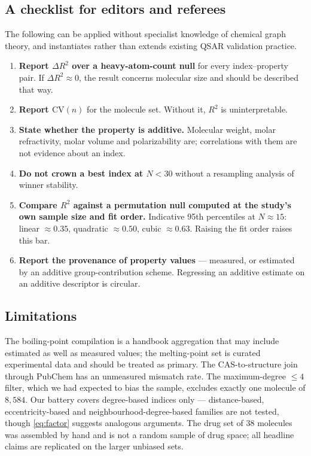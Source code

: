 \documentclass[11pt,a4paper]{article}
\theoremstyle{plain}
\newcommand{\CV}{\mathrm{CV}}
\begin{document}
\subsection{A checklist for editors and referees}

The following can be applied without specialist knowledge of chemical graph theory, and
instantiates rather than extends existing QSAR validation practice.
\begin{enumerate}\itemsep2pt
\item \textbf{Report $\Delta R^2$ over a heavy-atom-count null} for every index--property
pair. If $\Delta R^2\approx0$, the result concerns molecular size and should be described
that way.
\item \textbf{Report $\CV(n)$} for the molecule set. Without it, $R^2$ is uninterpretable.
\item \textbf{State whether the property is additive.} Molecular weight, molar
refractivity, molar volume and polarizability are; correlations with them are not evidence
about an index.
\item \textbf{Do not crown a best index at $N<30$} without a resampling analysis of winner
stability.
\item \textbf{Compare $R^2$ against a permutation null computed at the study's own sample
size and fit order.} Indicative 95th percentiles at $N\approx15$: linear $\approx0.35$,
quadratic $\approx0.50$, cubic $\approx0.63$. Raising the fit order raises this bar.
\item \textbf{Report the provenance of property values} --- measured, or estimated by an
additive group-contribution scheme. Regressing an additive estimate on an additive
descriptor is circular.
\end{enumerate}

\subsection{Limitations}

The boiling-point compilation is a handbook aggregation that may include estimated as well
as measured values; the melting-point set is curated experimental data and should be
treated as primary. The CAS-to-structure join through PubChem has an unmeasured mismatch
rate. The maximum-degree $\le4$ filter, which we had expected to bias the sample, excludes
exactly one molecule of $8{,}584$. Our battery covers degree-based indices only ---
distance-based, eccentricity-based and neighbourhood-degree-based families are not tested,
though \eqref{eq:factor} suggests analogous arguments. The drug set of 38 molecules was
assembled by hand and is not a random sample of drug space; all headline claims are
replicated on the larger unbiased sets.
\end{document}
